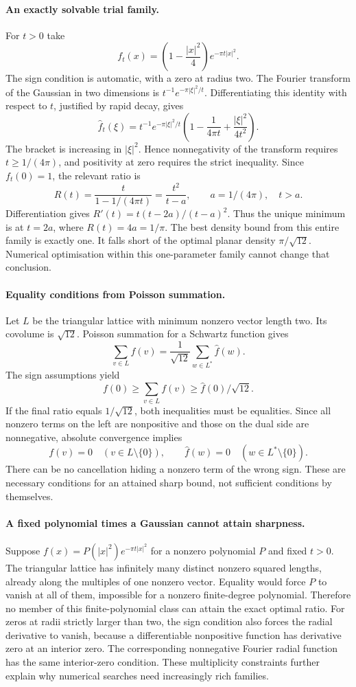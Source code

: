 \documentclass[11pt,a4paper]{article}
\begin{document}
\paragraph{An exactly solvable trial family.}
For $t>0$ take
\[
 f_t(x)=\left(1-\frac{|x|^2}{4}\right)e^{-\pi t|x|^2}.
\]
The sign condition is automatic, with a zero at radius two. The Fourier transform of the Gaussian in two dimensions is $t^{-1}e^{-\pi|\xi|^2/t}$. Differentiating this identity with respect to $t$, justified by rapid decay, gives
\[
 \widehat f_t(\xi)=t^{-1}e^{-\pi|\xi|^2/t}
 \left(1-\frac1{4\pi t}+\frac{|\xi|^2}{4t^2}\right).
\]
The bracket is increasing in $|\xi|^2$. Hence nonnegativity of the transform requires $t\geq1/(4\pi)$, and positivity at zero requires the strict inequality. Since $f_t(0)=1$, the relevant ratio is
\[
 R(t)=\frac{t}{1-1/(4\pi t)}=\frac{t^2}{t-a},
 \qquad a=1/(4\pi),\quad t>a.
\]
Differentiation gives $R'(t)=t(t-2a)/(t-a)^2$. Thus the unique minimum is at $t=2a$, where $R(t)=4a=1/\pi$. The best density bound from this entire family is exactly one. It falls short of the optimal planar density $\pi/\sqrt{12}$. Numerical optimisation within this one-parameter family cannot change that conclusion.

\paragraph{Equality conditions from Poisson summation.}
Let $L$ be the triangular lattice with minimum nonzero vector length two. Its covolume is $\sqrt{12}$. Poisson summation for a Schwartz function gives
\[
 \sum_{v\in L}f(v)=\frac1{\sqrt{12}}\sum_{w\in L^*}\widehat f(w).
\]
The sign assumptions yield
\[
 f(0)\geq\sum_{v\in L}f(v)
 \geq\widehat f(0)/\sqrt{12}.
\]
If the final ratio equals $1/\sqrt{12}$, both inequalities must be equalities. Since all nonzero terms on the left are nonpositive and those on the dual side are nonnegative, absolute convergence implies
\[
 f(v)=0\quad(v\in L\setminus\{0\}),\qquad
 \widehat f(w)=0\quad(w\in L^*\setminus\{0\}).
\]
There can be no cancellation hiding a nonzero term of the wrong sign. These are necessary conditions for an attained sharp bound, not sufficient conditions by themselves.

\paragraph{A fixed polynomial times a Gaussian cannot attain sharpness.}
Suppose $f(x)=P(|x|^2)e^{-\pi t|x|^2}$ for a nonzero polynomial $P$ and fixed $t>0$. The triangular lattice has infinitely many distinct nonzero squared lengths, already along the multiples of one nonzero vector. Equality would force $P$ to vanish at all of them, impossible for a nonzero finite-degree polynomial. Therefore no member of this finite-polynomial class can attain the exact optimal ratio. For zeros at radii strictly larger than two, the sign condition also forces the radial derivative to vanish, because a differentiable nonpositive function has derivative zero at an interior zero. The corresponding nonnegative Fourier radial function has the same interior-zero condition. These multiplicity constraints further explain why numerical searches need increasingly rich families.
\end{document}

